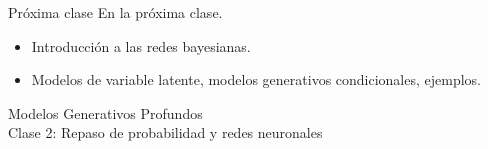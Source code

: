 \documentclass{beamer}
\begin{document}
\begin{frame}{Próxima clase}
    En la próxima clase.
    \begin{itemize}
        \item Introducción a las redes bayesianas.
        \item Modelos de variable latente, modelos generativos condicionales, ejemplos.
    \end{itemize}
\end{frame}

\begin{frame}
    \centering
    \Large{Modelos Generativos Profundos}\\
    \large{Clase 2: Repaso de probabilidad y redes neuronales}
\end{frame}
\end{document}
